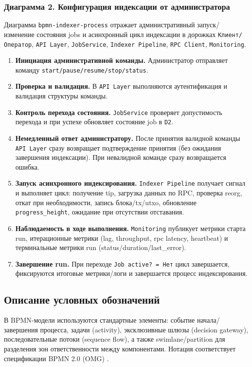 ﻿\documentclass[14pt,a4paper]{extarticle}
\begin{document}
\subsubsection{Диаграмма 2. Конфигурация индексации от администратора}
\noindent Диаграмма \texttt{bpmn-indexer-process} отражает административный запуск/изменение состояния jobs и асинхронный цикл индексации в дорожках \texttt{Клиент/Оператор}, \texttt{API Layer}, \texttt{JobService}, \texttt{Indexer Pipeline}, \texttt{RPC Client}, \texttt{Monitoring}.
\begin{enumerate}
  \item \textbf{Инициация административной команды.} Администратор отправляет команду \texttt{start/pause/resume/stop/status}.
  \item \textbf{Проверка и валидация.} В \texttt{API Layer} выполняются аутентификация и валидация структуры команды.
  \item \textbf{Контроль перехода состояния.} \texttt{JobService} проверяет допустимость перехода и при успехе обновляет состояние job в \texttt{D2}.
  \item \textbf{Немедленный ответ администратору.} После принятия валидной команды \texttt{API Layer} сразу возвращает подтверждение принятия (без ожидания завершения индексации). При невалидной команде сразу возвращается ошибка.
  \item \textbf{Запуск асинхронного индексирования.} \texttt{Indexer Pipeline} получает сигнал и выполняет цикл: получение tip, загрузка данных по RPC, проверка reorg, откат при необходимости, запись блока/tx/utxo, обновление \texttt{progress\_height}, ожидание при отсутствии отставания.
  \item \textbf{Наблюдаемость в ходе выполнения.} \texttt{Monitoring} публикует метрики старта run, итерационные метрики (lag, throughput, rpc latency, heartbeat) и терминальные метрики run (status/duration/last\_error).
  \item \textbf{Завершение run.} При переходе \texttt{Job active? = Нет} цикл завершается, фиксируются итоговые метрики/логи и завершается процесс индексирования.
\end{enumerate}

\subsection{Описание условных обозначений}
\noindent В BPMN-модели используются стандартные элементы: событие начала/завершения процесса, задачи (activity), эксклюзивные шлюзы (decision gateway), последовательные потоки (sequence flow), а также swimlane/partition для разделения зон ответственности между компонентами. Нотация соответствует спецификации BPMN 2.0 (OMG) \cite{src_bpmn}.
\end{document}
